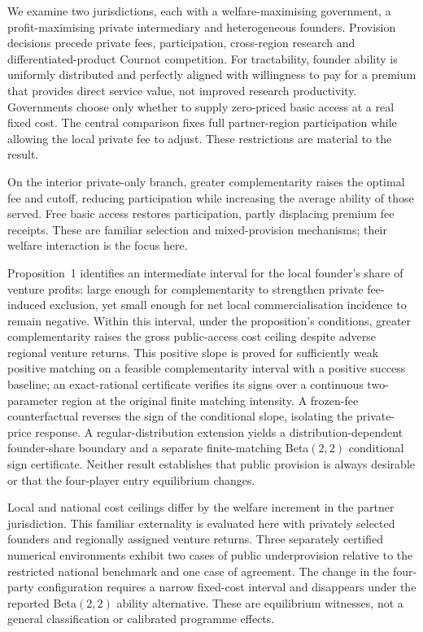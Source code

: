 We examine two jurisdictions, each with a welfare-maximising government, a profit-maximising private intermediary and heterogeneous founders. Provision decisions precede private fees, participation, cross-region research and differentiated-product Cournot competition. For tractability, founder ability is uniformly distributed and perfectly aligned with willingness to pay for a premium that provides direct service value, not improved research productivity. Governments choose only whether to supply zero-priced basic access at a real fixed cost. The central comparison fixes full partner-region participation while allowing the local private fee to adjust. These restrictions are material to the result.

On the interior private-only branch, greater complementarity raises the optimal fee and cutoff, reducing participation while increasing the average ability of those served. Free basic access restores participation, partly displacing premium fee receipts. These are familiar selection and mixed-provision mechanisms; their welfare interaction is the focus here.

Proposition~1 identifies an intermediate interval for the local founder's share of venture profits: large enough for complementarity to strengthen private fee-induced exclusion, yet small enough for net local commercialisation incidence to remain negative. Within this interval, under the proposition's conditions, greater complementarity raises the gross public-access cost ceiling despite adverse regional venture returns. This positive slope is proved for sufficiently weak positive matching on a feasible complementarity interval with a positive success baseline; an exact-rational certificate verifies its signs over a continuous two-parameter region at the original finite matching intensity. A frozen-fee counterfactual reverses the sign of the conditional slope, isolating the private-price response. A regular-distribution extension yields a distribution-dependent founder-share boundary and a separate finite-matching Beta$(2,2)$ conditional sign certificate. Neither result establishes that public provision is always desirable or that the four-player entry equilibrium changes.

Local and national cost ceilings differ by the welfare increment in the partner jurisdiction. This familiar externality is evaluated here with privately selected founders and regionally assigned venture returns. Three separately certified numerical environments exhibit two cases of public underprovision relative to the restricted national benchmark and one case of agreement. The change in the four-party configuration requires a narrow fixed-cost interval and disappears under the reported Beta$(2,2)$ ability alternative. These are equilibrium witnesses, not a general classification or calibrated programme effects.

